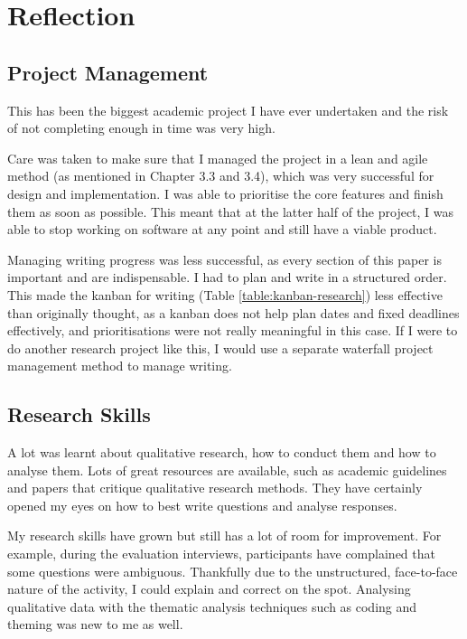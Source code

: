 \chapter{Reflection} 

\section{Project Management}

This has been the biggest academic project I have ever undertaken and 
the risk of not completing enough in time was very high.

Care was taken to make sure that I managed the project in a lean and agile method (as mentioned in Chapter 3.3 and 3.4), 
which was very successful for design and implementation. 
I was able to prioritise the core features and finish them as soon as possible. 
This meant that at the latter half of the project, I was able to stop working on software at any point and still have a viable product.

Managing writing progress was less successful, as every section of this paper is important and are indispensable. 
I had to plan and write in a structured order. This made the kanban for writing (Table \ref{table:kanban-research}) 
less effective than originally thought, as a kanban does not help plan dates and fixed deadlines effectively, 
and prioritisations were not really meaningful in this case. 
If I were to do another research project like this, I would use a separate waterfall project management method to manage writing.

\section{Research Skills}

A lot was learnt about qualitative research, how to conduct them and how to analyse them.
Lots of great resources are available, such as academic guidelines and papers that critique qualitative research methods.
They have certainly opened my eyes on how to best write questions and analyse responses.

My research skills have grown but still has a lot of room for improvement. 
For example, during the evaluation interviews, participants have complained that some questions were ambiguous. 
Thankfully due to the unstructured, face-to-face nature of the activity, I could explain and correct on the spot.
Analysing qualitative data with the thematic analysis techniques such as coding and theming \citep{clarke2014thematic} 
was new to me as well.

